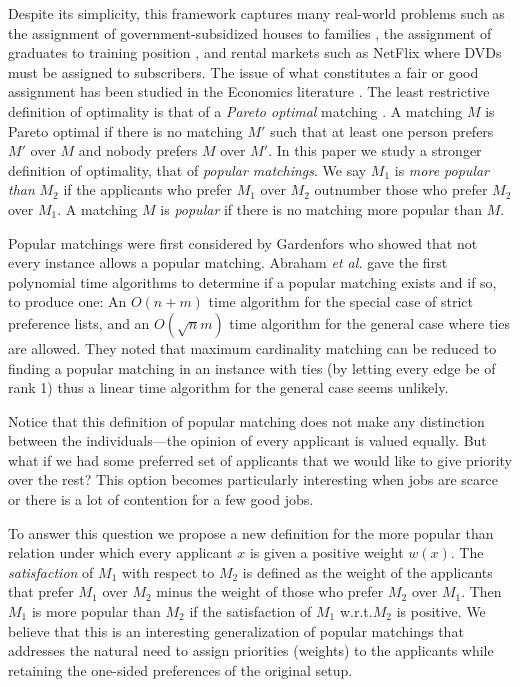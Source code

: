 \documentclass[11pt]{article}
\newcommand{\wrt}{{w.r.t.}\xspace}
\newcommand{\etal} {{\it et al. }}
\begin{document}
Despite its simplicity, this framework captures many real-world problems such as the assignment of government-subsidized houses to families \cite{Y96}, the assignment of graduates to training position \cite{HZ79}, and rental markets such as NetFlix \cite{ACKM06} where DVDs must be assigned to subscribers. The issue of what constitutes a fair or good assignment has been studied in the Economics literature \cite{AS98,Y96,Z90}. The least restrictive definition of optimality is that of a \emph{Pareto optimal} matching \cite{ACMM04,AS98}. A matching $M$ is Pareto optimal if there is no matching $M'$ such that at least one person prefers $M'$ over $M$ and nobody prefers $M$ over $M'$. In this paper we study a stronger definition of optimality, that of \emph{popular matchings}. We say $M_1$ is \emph{more popular than} $M_2$ if the applicants who prefer $M_1$ over $M_2$ outnumber those who prefer $M_2$ over $M_1$. A matching $M$ is \emph{popular} if there is no matching more popular than $M$.

Popular matchings were first considered by Gardenfors \cite{G75} who showed that not every instance allows a popular matching. Abraham \etal \cite{AIKM05} gave the first polynomial time algorithms to determine if a popular matching exists and if so, to produce one: An $O(n+m)$ time algorithm for the special case of strict preference lists, and an $O( \sqrt{n} m)$ time algorithm for the general case where ties are allowed. They noted that maximum cardinality matching can be reduced to finding a popular matching in an instance with ties (by letting every edge be of rank 1) thus a linear time algorithm for the general case seems unlikely.

Notice that this definition of popular matching does not make any distinction between the individuals---the opinion of every applicant is valued equally. But what if we had some preferred set of applicants that we would like to give priority over the rest? This option becomes particularly interesting when jobs are scarce or there is a lot of contention for a few good jobs.

To answer this question we propose a new definition for the more popular than relation under which every applicant $x$ is given a positive weight $w(x)$. The \emph{satisfaction} of $M_1$ with respect to $M_2$ is defined as the weight of the applicants that prefer $M_1$ over $M_2$ minus the weight of those who prefer $M_2$ over $M_1$. Then $M_1$ is more popular than $M_2$ if the satisfaction of $M_1$ \wrt $M_2$ is positive. We believe that this is an interesting generalization of popular matchings that addresses the natural need to assign priorities (weights) to the applicants while retaining the one-sided preferences of the original setup.
\end{document}
